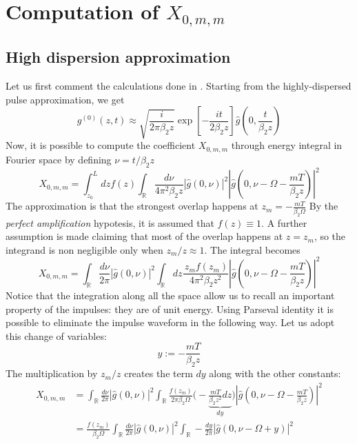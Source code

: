 \documentclass[10pt, lettersize, journal, onecolumn]{IEEEtran}
\begin{document}
\section{Computation of $X_{0, m, m}$} \label{approx}
	\subsection{High dispersion approximation}
Let us first comment the calculations done in \cite[eq. 11, 12]{Dar_2013}. Starting from the highly-dispersed pulse approximation, we get
\begin{equation}\label{eq:papoulis}
	g^{(0)}(z, t) \approx \sqrt{\frac{i}{2\pi \beta_2 z}} \exp\left[-\frac{it}{2 \beta_2 z}\right] \hat{g}\left(0, \frac{t}{\beta_2 z}\right)	
\end{equation}
Now, it is possible to compute the coefficient $X_{0, m, m}$ through energy integral in Fourier space by defining $\nu = t/\beta_2 z$
\begin{equation}
	X_{0, m, m} = \int_{z_0}^{L} dz f(z) \int_{\mathbb{R}} \frac{d\nu}{4\pi^2 \beta_2 z} |\hat{g}(0, \nu)|^2 \left|\hat{g}\left(0, \nu-\Omega-\frac{mT}{\beta_2 z}\right)\right|^2
\end{equation}
The approximation is that the strongest overlap happens at $z_m = -\frac{mT}{\beta_2 \Omega}$
By the \textit{perfect amplification} hypotesis, it is assumed that $f(z) \equiv 1$. A further assumption is made claiming that most of the overlap happens at $z=z_m$, so the integrand is non negligible only when $z_m/z \approx 1$. 
The integral becomes
\begin{equation}
	X_{0, m, m} = \int_{\mathbb{R}} \frac{d\nu}{2\pi}  |\hat{g}(0, \nu)|^2 \int_{\mathbb{R}} dz\frac{\, z_m f(z_m)}{4\pi^2 \beta_2 z^2}\left|\hat{g}\left(0, \nu-\Omega-\frac{mT}{\beta_2 z}\right)\right|^2
\end{equation}
Notice that the integration along all the space allow us to recall an important property of the impulses: they are of unit energy. Using Parseval identity it is possible to eliminate the impulse waveform in the following way.
Let us adopt this change of variables:
\begin{equation}
	y:= -\frac{mT}{\beta_2 z} 
\end{equation}
The multiplication by $z_m/z$ creates the term $dy$ along with the other constants:
\begin{align}
	X_{0, m, m} &= \int_{\mathbb{R}} \frac{d\nu}{2\pi}  |\hat{g}(0, \nu)|^2 \int_{\mathbb{R}} \frac{f(z_m)}{2\pi \beta_2 \Omega}  \Big(-\underbrace{\frac{mT}{\beta_2 z^2} dz}_{dy}\Big) \left|\hat{g}\left(0, \nu-\Omega-\frac{mT}{\beta_2 z}\right)\right|^2 \\
	&=  \frac{f(z_m)}{ \beta_2 \Omega}\int_{\mathbb{R}} \frac{d\nu}{2\pi}  |\hat{g}(0, \nu)|^2 \int_{\mathbb{R}} - \frac{dy}{2\pi} \left|\hat{g}\left(0, \nu-\Omega + y \right)\right|^2
\end{align}
\end{document}
